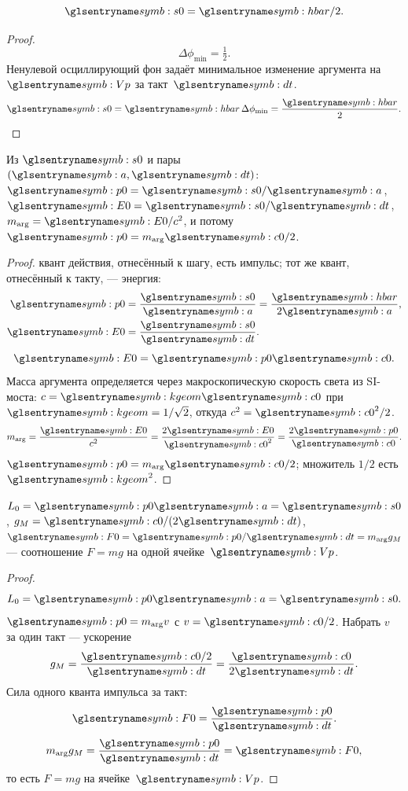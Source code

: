 \begin{lemma}[5.1a]
\label{lem:51a}
\[
  \ladderAction=\planckHbar/2.
\]
\end{lemma}

\begin{proof}
\[
  \Delta\phi_{\min}=\tfrac12.
\]
Ненулевой осциллирующий фон задаёт минимальное изменение аргумента на~$\hv$ за такт~$\htick$.
\pfollows
\[
  \ladderAction=\planckHbar\,\Delta\phi_{\min}=\frac{\planckHbar}{2}.
\]
\end{proof}

\begin{lemma}[5.1b]
\label{lem:51b}
Из $\ladderAction$ и пары $(\caStepSpace,\htick)$: $\ladderMomentum=\ladderAction/\caStepSpace$, $\ladderEnergy=\ladderAction/\htick$, $m_{\arg}=\ladderEnergy/c^2$,
и потому $\ladderMomentum=m_{\arg} \caSignalSpeed/2$.
\end{lemma}

\begin{proof}
квант действия, отнесённый к шагу, есть импульс; тот же квант, отнесённый к такту, --- энергия:
\begin{align}
  \ladderMomentum &= \frac{\ladderAction}{\caStepSpace} = \frac{\planckHbar}{2\caStepSpace}, \\
  \ladderEnergy &= \frac{\ladderAction}{\htick}.
\end{align}
\[
  \ladderEnergy=\ladderMomentum \caSignalSpeed.
\]
Масса аргумента определяется через макроскопическую скорость света из SI-моста:
$c=\kgeom \caSignalSpeed$ при $\kgeom=1/\sqrt{2}$, откуда $c^2=\caSignalSpeed^2/2$.
\[
  m_{\arg}=\frac{\ladderEnergy}{c^2}=\frac{2\ladderEnergy}{\caSignalSpeed^2}=\frac{2\ladderMomentum}{\caSignalSpeed}.
\]
\pfollows $\ladderMomentum=m_{\arg} \caSignalSpeed/2$; множитель $1/2$ есть $\kgeom^2$.
\end{proof}

\begin{lemma}[5.1c]
\label{lem:51c}
$L_0=\ladderMomentum\caStepSpace=\ladderAction$, $g_M=\caSignalSpeed/(2\htick)$, $\ladderForce=\ladderMomentum/\htick=m_{\arg} g_M$ ---
соотношение $F=mg$ на одной ячейке~$\hv$.
\end{lemma}

\begin{proof}
\[
  L_0=\ladderMomentum\caStepSpace=\ladderAction.
\]
$\ladderMomentum=m_{\arg} v$ с $v=\caSignalSpeed/2$.
Набрать $v$ за один такт --- ускорение
\[
  g_M=\frac{\caSignalSpeed/2}{\htick}=\frac{\caSignalSpeed}{2\htick}.
\]
Сила одного кванта импульса за такт:
\[
  \ladderForce=\frac{\ladderMomentum}{\htick}.
\]
\[
  m_{\arg} g_M=\frac{\ladderMomentum}{\htick}=\ladderForce,
\]
то есть $F=mg$ на ячейке~$\hv$.
\end{proof}

